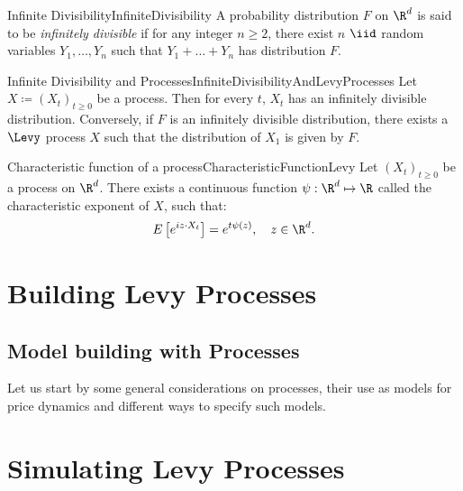 
\begin{defn}{Infinite Divisibility}{InfiniteDivisibility}
	A probability distribution $F$ on $\R^d$ is said to be \textit{infinitely divisible} if for any integer $n \ge 2$, there exist $n$ $\iid$ random variables $Y_1, \dots, Y_n$ such that $Y_1 + \dots + Y_n$ has distribution $F$.
\end{defn}

\begin{prop}{Infinite Divisibility and \Levy{} Processes}{InfiniteDivisibilityAndLevyProcesses}
	Let $X \coloneqq (X_t)_{t \ge 0}$ be a  \Levy{} process. Then for every $t$, $X_t$ has an infinitely divisible distribution. Conversely, if $F$ is an infinitely divisible distribution, there exists a $\Levy$ process $X$ such that the distribution of $X_1$ is given by $F$.
\end{prop}

\begin{prop}{Characteristic function of a \Levy{} process}{CharacteristicFunctionLevy}
	Let $(X_t)_{t\geq 0}$ be a \Levy{} process on $\R^d$. There exists a continuous function $\psi : \R^d \mapsto \R$ called the characteristic exponent of $X$, such that:
	\begin{equation}\label{eq:CharacteristicFunction}
		E\left[e^{iz \cdot X_t}\right] = e^{t\psi(z)}, \quad z \in \R^d.
	\end{equation}
\end{prop}



\section{Building Levy Processes}

\subsection{Model building with \Levy{} Processes}
Let us start by some general considerations on \Levy{} processes, their use as models for price dynamics and different ways to specify such models.
\section{Simulating Levy Processes}



